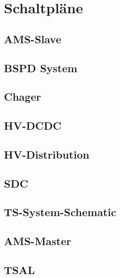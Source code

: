 
%
%
%
%

\section{Schaltpläne}
\subsection{\ac{AMS}-Slave}

\subsection{\ac{BSPD} System}

\subsection{Chager}

\subsection{\ac{HV}-DCDC}

\subsection{HV-Distribution}

\subsection{\ac{SDC}}

\subsection{\ac{TS}-System-Schematic}

\subsection{\ac{AMS}-Master}

\subsection{\ac{TSAL}}

